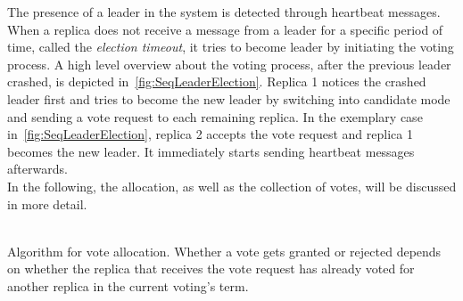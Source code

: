 The presence of a leader in the system is detected through heartbeat messages.
When a replica does not receive a message from a leader for a specific period of time, called the \textit{election timeout}, it tries to become leader by initiating the voting process.
A high level overview about the voting process, after the previous leader crashed, is depicted in~\autoref{fig:SeqLeaderElection}.
Replica 1 notices the crashed leader first and tries to become the new leader by switching into candidate mode and sending a vote request to each remaining replica.
In the exemplary case in~\autoref{fig:SeqLeaderElection}, replica 2 accepts the vote request and replica 1 becomes the new leader.
It immediately starts sending heartbeat messages afterwards.
\\
In the following, the allocation, as well as the collection of votes, will be discussed in more detail.
\\\\
\begin{algorithm}[H]
\caption{Algorithm for vote allocation. Whether a vote gets granted or rejected depends on whether the replica that receives the vote request has already voted for another replica in the current voting's term.}\label{algo:VoteAllocation}

\BlankLine
{}
\end{algorithm}


